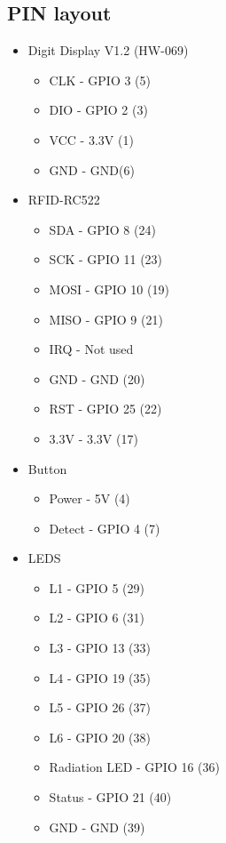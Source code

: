 \documentclass{article}
\begin{document}
\subsection{PIN layout} \label{pins}
\begin{itemize}
    \item Digit Display V1.2 (HW-069)
        \begin{itemize}
            \item CLK - GPIO 3 (5)
            \item DIO - GPIO 2 (3)
            \item VCC - 3.3V (1)
            \item GND - GND(6)
        \end{itemize}
    \item RFID-RC522
        \begin{itemize}
            \item SDA - GPIO 8 (24)
            \item SCK - GPIO 11 (23)
            \item MOSI - GPIO 10 (19)
            \item MISO - GPIO 9 (21)
            \item IRQ - Not used
            \item GND - GND (20)
            \item RST - GPIO 25 (22)
            \item 3.3V - 3.3V (17)
        \end{itemize}
    \item Button
        \begin{itemize}
            \item Power - 5V (4)
            \item Detect - GPIO 4 (7)
        \end{itemize}
    \item LEDS
        \begin{itemize}
            \item L1 - GPIO 5 (29)
            \item L2 - GPIO 6 (31)
            \item L3 - GPIO 13 (33)
            \item L4 - GPIO 19 (35)
            \item L5 - GPIO 26 (37)
            \item L6 - GPIO 20 (38)
            \item Radiation LED - GPIO 16 (36)
            \item Status - GPIO 21 (40)
            \item GND - GND (39)
        \end{itemize}
\end{itemize}
\end{document}
